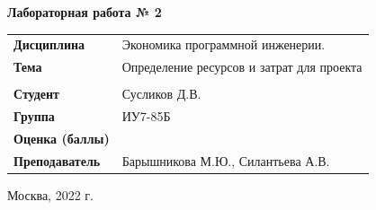 \documentclass[a4paper,14pt]{extreport} %
\begin{document}
\begin{titlepage}
    \vspace{2cm}

    \begin{center}
        \textbf{Лабораторная работа № 2} \\
        \vspace{0.5cm}
    \end{center}

    \vspace{4cm}

    \begin{flushleft}
        \begin{tabular}{ll}
            \textbf{Дисциплина} & Экономика программной инженерии.  \\
            \textbf{Тема} & Определение ресурсов и затрат для проекта \\
            \\
            \textbf{Студент} & Сусликов Д.В. \\
            \textbf{Группа} & ИУ7-85Б \\
            \textbf{Оценка (баллы)} & \\
            \textbf{Преподаватель} & Барышникова М.Ю., Силантьева А.В.   \\
        \end{tabular}
    \end{flushleft}

    \vspace{4cm}

   \begin{center}
        Москва, 2022 г.
    \end{center}

\end{titlepage}
\end{document}
